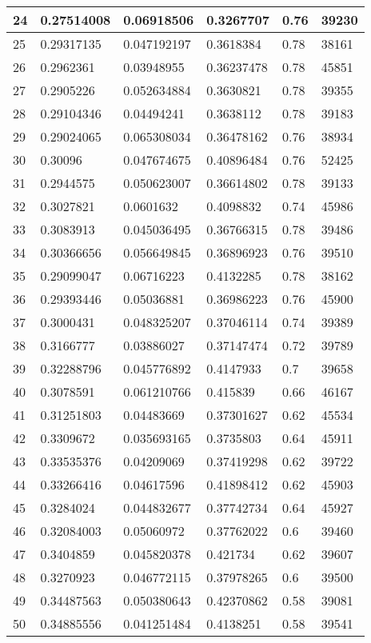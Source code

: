 \begin{longtable}{|l|l|l|l|l|l|}
24 & 0.27514008 & 0.06918506 & 0.3267707 & 0.76 & 39230 \\ \hline 
25 & 0.29317135 & 0.047192197 & 0.3618384 & 0.78 & 38161 \\ \hline 
26 & 0.2962361 & 0.03948955 & 0.36237478 & 0.78 & 45851 \\ \hline 
27 & 0.2905226 & 0.052634884 & 0.3630821 & 0.78 & 39355 \\ \hline 
28 & 0.29104346 & 0.04494241 & 0.3638112 & 0.78 & 39183 \\ \hline 
29 & 0.29024065 & 0.065308034 & 0.36478162 & 0.76 & 38934 \\ \hline 
30 & 0.30096 & 0.047674675 & 0.40896484 & 0.76 & 52425 \\ \hline 
31 & 0.2944575 & 0.050623007 & 0.36614802 & 0.78 & 39133 \\ \hline 
32 & 0.3027821 & 0.0601632 & 0.4098832 & 0.74 & 45986 \\ \hline 
33 & 0.3083913 & 0.045036495 & 0.36766315 & 0.78 & 39486 \\ \hline 
34 & 0.30366656 & 0.056649845 & 0.36896923 & 0.76 & 39510 \\ \hline 
35 & 0.29099047 & 0.06716223 & 0.4132285 & 0.78 & 38162 \\ \hline 
36 & 0.29393446 & 0.05036881 & 0.36986223 & 0.76 & 45900 \\ \hline 
37 & 0.3000431 & 0.048325207 & 0.37046114 & 0.74 & 39389 \\ \hline 
38 & 0.3166777 & 0.03886027 & 0.37147474 & 0.72 & 39789 \\ \hline 
39 & 0.32288796 & 0.045776892 & 0.4147933 & 0.7 & 39658 \\ \hline 
40 & 0.3078591 & 0.061210766 & 0.415839 & 0.66 & 46167 \\ \hline 
41 & 0.31251803 & 0.04483669 & 0.37301627 & 0.62 & 45534 \\ \hline 
42 & 0.3309672 & 0.035693165 & 0.3735803 & 0.64 & 45911 \\ \hline 
43 & 0.33535376 & 0.04209069 & 0.37419298 & 0.62 & 39722 \\ \hline 
44 & 0.33266416 & 0.04617596 & 0.41898412 & 0.62 & 45903 \\ \hline 
45 & 0.3284024 & 0.044832677 & 0.37742734 & 0.64 & 45927 \\ \hline 
46 & 0.32084003 & 0.05060972 & 0.37762022 & 0.6 & 39460 \\ \hline 
47 & 0.3404859 & 0.045820378 & 0.421734 & 0.62 & 39607 \\ \hline 
48 & 0.3270923 & 0.046772115 & 0.37978265 & 0.6 & 39500 \\ \hline 
49 & 0.34487563 & 0.050380643 & 0.42370862 & 0.58 & 39081 \\ \hline 
50 & 0.34885556 & 0.041251484 & 0.4138251 & 0.58 & 39541 \\ \hline 
\end{longtable}